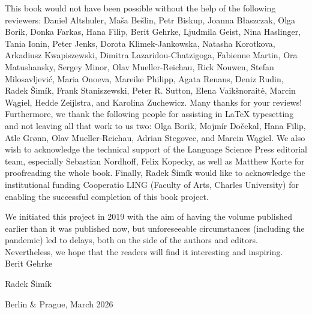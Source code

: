 \begin{refsection}
This book would not have been possible without the help of the following reviewers: Daniel Altshuler, Maša Bešlin, Petr Biskup, Joanna Błaszczak, Olga Borik, Donka Farkas, Hana Filip, Berit Gehrke, Ljudmila Geist, Nina Haslinger, Tania Ionin, Peter Jenks, Dorota Klimek-Jankowska, Natasha Korotkova, Arkadiusz Kwapiszewski, Dimitra Lazaridou-Chatzigoga, Fabienne Martin, Ora Matushansky, Sergey Minor, Olav Mueller-Reichau, Rick Nouwen, Stefan Milosavljević, Maria Onoeva, Mareike Philipp, 
Agata Renans, Deniz Rudin, Radek Šimík, Frank Staniszewski, Peter R. Sutton, Elena Vaikšnoraitė, Marcin Wągiel, Hedde Zeijlstra, and Karolina Zuchewicz. Many thanks for your reviews! Furthermore, we thank the following people for assisting in \LaTeX {} typesetting and not leaving all that work to us two: Olga Borik, Mojmír Dočekal, Hana Filip, Atle Grønn, Olav Mueller-Reichau, Adrian Stegovec, and Marcin Wągiel. We also wish to acknowledge the technical support of the Language Science Press editorial team, especially Sebastian Nordhoff, Felix Kopecky, as well as Matthew Korte for proofreading the whole book. Finally, Radek Šimík would like to acknowledge the institutional funding Cooperatio LING (Faculty of Arts, Charles University) for enabling the successful completion of this book project.%

We initiated this project in 2019 with the aim of having the volume published earlier than it was published now, but unforeseeable circumstances (including the pandemic) led to delays, both on the side of the authors and editors. Nevertheless, we hope that the readers will find it interesting and inspiring.\\

\hfill Berit Gehrke

\hfill Radek \v{S}imík

\hfill Berlin \& Prague, March 2026


\end{refsection}


